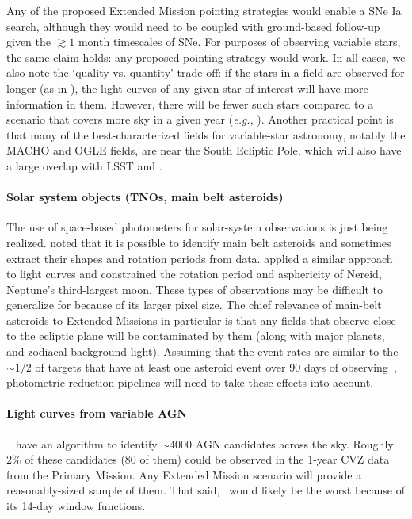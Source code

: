 Any of the proposed Extended Mission pointing strategies would enable a SNe Ia search, although they would need to be coupled with ground-based follow-up given the $\gtrsim 1$ month timescales of SNe.
For purposes of observing variable stars, the same claim holds: any proposed pointing strategy would work.
In all cases, we also note the `quality vs. quantity' trade-off: if the stars in a field are observed for longer (as in \npole), the light curves of any given star of interest will have more information in them.
However, there will be fewer such stars compared to a scenario that covers more sky in a given year (\textit{e.g.}, \nhemi).
Another practical point is that many of the best-characterized fields for variable-star astronomy, notably the MACHO and OGLE fields, are near the South Ecliptic Pole, which will also have a large overlap with LSST and \gaia\!.



\paragraph{Solar system objects (TNOs, main belt asteroids)}
The use of space-based photometers for solar-system observations is just being realized.
\citet{szabo_mainbelt_2015} noted that it is possible to identify main belt asteroids and sometimes extract their shapes and rotation periods from \ktwo data.
\citep{kiss_nereid_2016} applied a similar approach to \ktwo light curves and constrained the rotation period and asphericity of Nereid, Neptune's third-largest moon.
These types of observations may be difficult to generalize for \tess because of its larger pixel size. 
The chief relevance of main-belt asteroids to Extended Missions in particular is that any fields that observe close to the ecliptic plane will be contaminated by them (along with major planets, and zodiacal background light).
Assuming that the event rates are similar to the $\sim\!1/2$ of targets that have at least one asteroid event over 90 days of \ktwo observing~\citep{szabo_mainbelt_2015}, \tesss photometric reduction pipelines will need to take these effects into account.

\paragraph{Light curves from variable AGN}
~\citet{edelson_agn_2013} have an algorithm to identify $\sim$4000 AGN candidates across the sky.
Roughly $2\%$ of these candidates (80 of them) could be observed in the 1-year CVZ data from the Primary Mission.
Any Extended Mission scenario will provide a reasonably-sized sample of them. %
That said, \hemis\ would likely be the worst because of its 14-day window functions.




